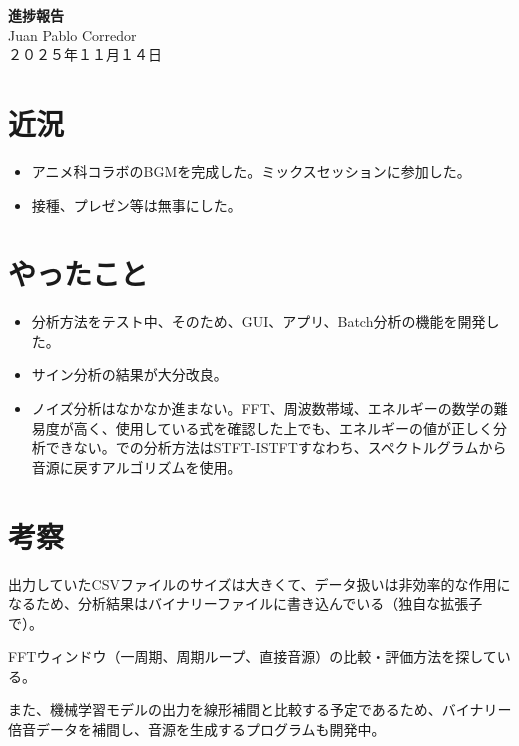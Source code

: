 \documentclass[a4paper, 11pt]{article}
\begin{document}
\begin{center}
    {\LARGE \bfseries 進捗報告} \\ %
    \vspace{0.3em} %
    Juan Pablo Corredor \\ %
    ２０２５年１１月１４日 %
\end{center}
\vspace{0.5em} %

\section*{近況}
\begin{itemize}
    \item アニメ科コラボのBGMを完成した。ミックスセッションに参加した。
    \item 接種、プレゼン等は無事にした。
\end{itemize} 

\section*{やったこと}
\begin{itemize} 
    \item 分析方法をテスト中、そのため、GUI、アプリ、Batch分析の機能を開発した。 
    \item サイン分析の結果が大分改良。 
    \item ノイズ分析はなかなか進まない。FFT、周波数帯域、エネルギーの数学の難易度が高く、使用している式を確認した上でも、エネルギーの値が正しく分析できない。\cite{sitrano}での分析方法はSTFT-ISTFTすなわち、スペクトルグラムから音源に戻すアルゴリズムを使用。
\end{itemize}

\section*{考察}

出力していたCSVファイルのサイズは大きくて、データ扱いは非効率的な作用になるため、分析結果はバイナリーファイルに書き込んでいる（独自な拡張子で）。

FFTウィンドウ（一周期、周期ループ、直接音源）の比較・評価方法を探している。

また、機械学習モデルの出力を線形補間と比較する予定であるため、バイナリー倍音データを補間し、音源を生成するプログラムも開発中。
\end{document}

